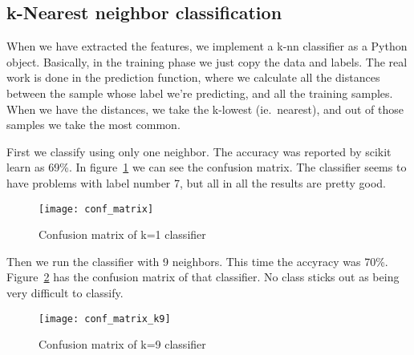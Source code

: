 \subsection{k-Nearest neighbor classification}

When we have extracted the features, we implement a k-nn classifier as a Python
object. Basically, in the training phase we just copy the data and labels. The
real work is done in the prediction function, where we calculate all the
distances between the sample whose label we're predicting, and all the training
samples. When we have the distances, we take the k-lowest (ie.\ nearest), and
out of those samples we take the most common.

First we classify using only one neighbor. The accuracy was reported by scikit
learn as 69\%. In figure~\ref{fig:conf_mat} we can see the confusion matrix.
The classifier seems to have problems with label number 7, but all in all the
results are pretty good.
\begin{figure}[H]
  \centering
  \texttt{[image: conf\_matrix]}
  \caption{Confusion matrix of k=1 classifier}
\label{fig:conf_mat}
\end{figure}


Then we run the classifier with 9 neighbors. This time the accyracy was 70\%.
Figure~\ref{fig:conf_mat_k9} has the confusion matrix of that classifier. No
class sticks out as being very difficult to classify.
\begin{figure}[H]
  \centering
  \texttt{[image: conf\_matrix\_k9]}
  \caption{Confusion matrix of k=9 classifier}
\label{fig:conf_mat_k9}
\end{figure}










